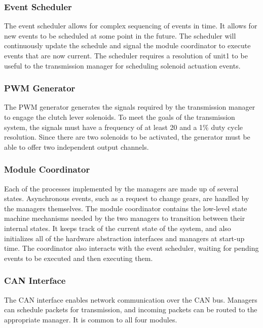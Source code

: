 \subsubsection{Event Scheduler}

The event scheduler allows for complex sequencing of events in time. It allows for new events to be scheduled at some point in the future.
The scheduler will continuously update the schedule and signal the module coordinator to execute events that are now current. The scheduler requires a resolution of unit{1}{\milli\second} to be useful to the transmission manager for scheduling solenoid actuation events.

\subsubsection{PWM Generator}

The PWM generator generates the signals required by the transmission manager to engage the clutch lever solenoids. To meet the goals of the transmission system, the signals must have a frequency of at least \unit{20}{\hertz} and a 1\% duty cycle resolution. Since there are two solenoids to be activated, the generator must be able to offer two independent output channels.

\subsubsection{Module Coordinator}

Each of the processes implemented by the managers are made up of several states. Asynchronous events, such as a request to change gears, are handled by the managers themselves. The module coordinator contains the low-level state machine mechanisms needed by the two managers to transition between their internal states. It keeps track of the current state of the system, and also initializes all of the hardware abstraction interfaces and managers at start-up time. The coordinator also interacts with the event scheduler, waiting for pending events to be executed and then executing them.

\subsubsection{CAN Interface}

The CAN interface enables network communication over the CAN bus. Managers can schedule packets for transmission, and incoming packets can be routed to the appropriate manager. It is common to all four modules.

